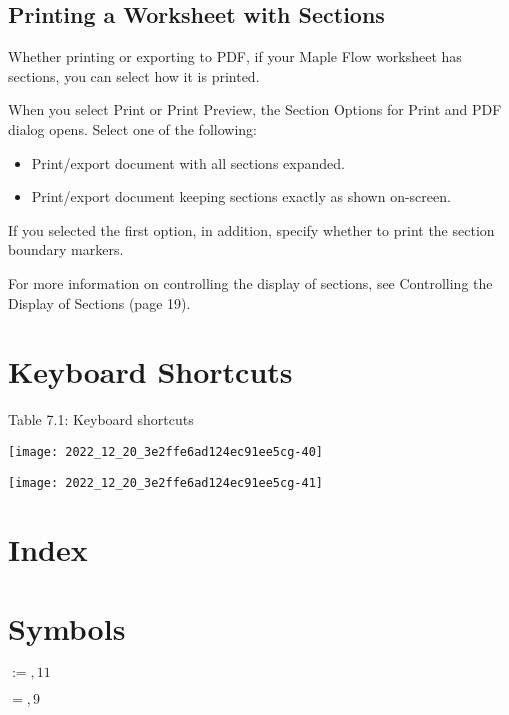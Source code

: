 \subsection{Printing a Worksheet with Sections}
Whether printing or exporting to PDF, if your Maple Flow worksheet has sections, you can select how it is printed.

When you select Print or Print Preview, the Section Options for Print and PDF dialog opens. Select one of the following:

\begin{itemize}
  \item Print/export document with all sections expanded.

  \item Print/export document keeping sections exactly as shown on-screen.

\end{itemize}

If you selected the first option, in addition, specify whether to print the section boundary markers.

For more information on controlling the display of sections, see Controlling the Display of Sections (page 19).

\section{Keyboard Shortcuts}
Table 7.1: Keyboard shortcuts

\begin{center}
\texttt{[image: 2022\_12\_20\_3e2ffe6ad124ec91ee5cg-40]}
\end{center}

\begin{center}
\texttt{[image: 2022\_12\_20\_3e2ffe6ad124ec91ee5cg-41]}
\end{center}

\section{Index}
\section{Symbols}
$:=, 11$

$=, 9$

